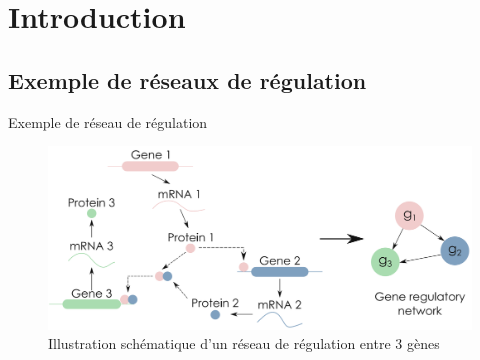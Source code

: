 \section{Introduction}
\subsection{Exemple de réseaux de régulation}
\begin{frame}{Exemple de réseau de régulation}
	\begin{figure}
	    \centering
	    \includegraphics[scale = 0.4]{Figures/Intro/network.PNG}
	    \caption{Illustration schématique d'un réseau de régulation entre 3 gènes \scriptsize \cite{sanguinetti2019gene}}
	    \label{fig:my_label}
	\end{figure}
\end{frame}



